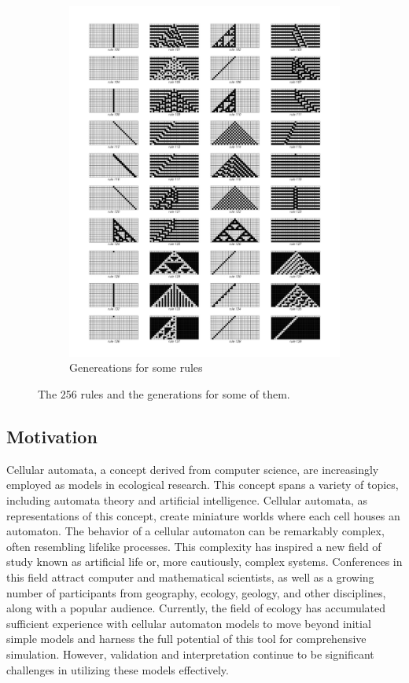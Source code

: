 \documentclass[9pt,a4paper,twoside]{tau-class/tau}
\begin{document}
\begin{figure}[tp]
\begin{subfigure}[b]{0.375\linewidth}
			\includegraphics[width=\linewidth]{figures/generetions.png}
			\caption{Genereations for some rules}
		\end{subfigure}
		\caption{The 256 rules and the generations for some of them.}
		\label{fig:floatrules}
	\end{figure}

    \subsection{Motivation}
    
    
    Cellular automata, a concept derived from computer science, are increasingly employed as models in ecological research. This concept spans a variety of topics, including automata theory and artificial intelligence. 
    Cellular automata, as representations of this concept, create miniature worlds where each cell houses an automaton. The behavior of a cellular automaton can be remarkably complex, often resembling lifelike processes. 
    This complexity has inspired a new field of study known as artificial life or, more cautiously, complex systems. Conferences in this field attract computer and mathematical scientists, as well as a growing number of participants from geography, ecology, geology, and other disciplines, along with a popular audience. 
    Currently, the field of ecology has accumulated sufficient experience with cellular automaton models to move beyond initial simple models and harness the full potential of this tool for comprehensive simulation. 
    However, validation and interpretation continue to be significant challenges in utilizing these models effectively.\cite{DEWDNEY2008541}
\end{document}
